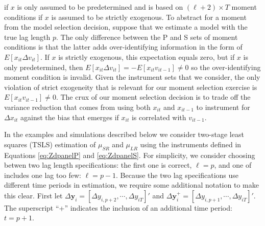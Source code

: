 if $x$ is only assumed to be predetermined and is based on $(\ell + 2)\times T$ moment conditions 
if $x$ is assumed to be strictly exogenous.
To abstract for a moment from the model selection decision, suppose that we estimate a model with the true lag length $p$.
The only difference between the P and S sets of moment conditions is that the latter adds over-identifying information in the form of $E[x_{it}\Delta v_{it}]$.
If $x$ is strictly exogenous, this expectation equals zero, but if $x$ is only predetermined, then $E[x_{it}\Delta v_{it}] = -E[x_{it}v_{it-1}] \neq 0$ so the over-identifying moment condition is invalid.
Given the instrument sets that we consider, the only violation of strict exogeneity that is relevant for our moment selection exercise is $E[x_{it}v_{it-1}]\neq 0$.
The crux of our moment selection decision is to trade off the variance reduction that comes from using both $x_{it}$ and $x_{it-1}$ to instrument for $\Delta x_{it}$ against the bias that emerges if $x_{it}$ is correlated with $v_{it-1}$.

In the examples and simulations described below we consider two-stage least squares (TSLS) estimation of $\mu_{SR}$ and $\mu_{LR}$ using the instruments defined in Equations \ref{eq:ZdpanelP} and \ref{eq:ZdpanelS}.
For simplicity, we consider choosing betwen two lag length specifications: the first one is correct, $\ell = p$, and one of includes one lag too few: $\ell = p - 1$.
Because the two lag specifications use different time periods in estimation, we require some additional notation to make this clear. 
First let $\Delta \mathbf{y}_{i} = [\Delta y_{i,p+2}, \cdots, \Delta y_{iT}]'$ and $\Delta \mathbf{y}^+_{i} = [\Delta y_{i,p+1}, \cdots, \Delta y_{iT}]'$.
The superscript ``+'' indicates the inclusion of an additional time period: $t = p+1$.


